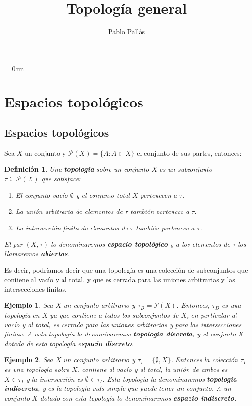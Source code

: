 \documentclass[12pt]{article}
\author{Pablo Pallàs}
\title{Topología general}
\newtheorem{definition}[theorem]{Definición}
\newtheorem{example}{Ejemplo}[theorem]
\begin{document}
\rmfamily
\maketitle
\tableofcontents
\parindent= 0cm

\section{Espacios topológicos}
\subsection{Espacios topológicos}
Sea $X$ un conjunto y $\mathcal{P}(X) = \lbrace A : A \subset X \rbrace$ el conjunto de sus partes, entonces:

\begin{definition}Una \textbf{topología} sobre un conjunto $X$ es un subconjunto $\tau \subseteq \mathcal{P}(X)$ que satisface: 
 \renewcommand{\theenumi}{\roman{enumi}} %
\begin{enumerate}
\item El conjunto vacío $\emptyset$ y el conjunto total $X$ pertenecen a $\tau$.
\item La unión arbitraria de elementos de $\tau$ también pertenece a $\tau$.
\item La intersección finita de elementos de $\tau$ también pertenece a $\tau$.
\end{enumerate}
El par $(X,\tau)$ lo denominaremos \textbf{espacio topológico} y a los elementos de $\tau$ los llamaremos \textbf{abiertos}.
\end{definition}

Es decir, podríamos decir que una topología es una colección de subconjuntos que contiene al vacío y al total, y que es cerrada para las uniones arbitrarias y las intersecciones finitas.

\begin{example}Sea $X$ un conjunto arbitrario y $\tau_D = \mathcal{P}(X)$. Entonces, $\tau_D$ es una topología en $X$ ya que contiene a todos los subconjuntos de $X$, en particular al vacío y al total, es cerrada para las uniones arbitrarias y para las intersecciones finitas. A esta topología la denominaremos \textbf{topología discreta}, y al conjunto $X$ dotada de esta topología \textbf{espacio discreto}.
\end{example}
\begin{example}Sea $X$ un conjunto arbitrario y $\tau_I = \lbrace \emptyset, X \rbrace$. Entonces la colección $\tau_I$ es una topología sobre $X$: contiene al vacío y al total, la unión de ambos es $X \in \tau_I$ y la intersección es $\emptyset \in \tau_I$. Esta topología la denominaremos \textbf{topología indiscreta}, y es la topología más simple que puede tener un conjunto. A un conjunto $X$ dotado con esta topología lo denominaremos \textbf{espacio indiscreto}.
\end{example}
\end{document}
